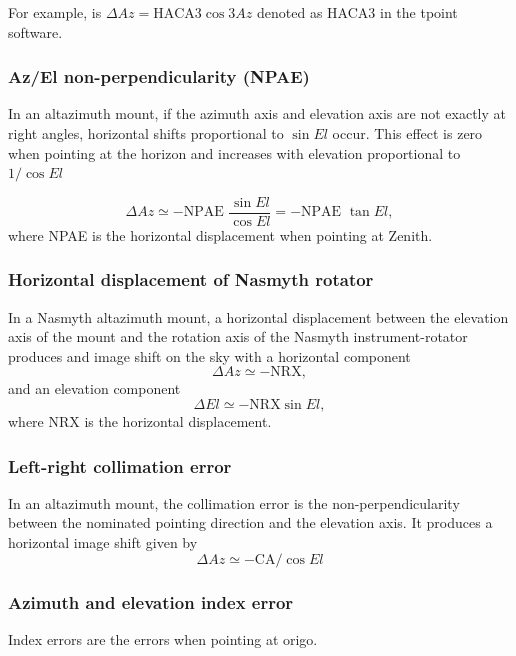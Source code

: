 For example, is $\Delta Az = \text{HACA3}\cos{3Az}$ denoted as HACA3 in the tpoint software.

\subsubsection{Az/El non-perpendicularity (NPAE)}
In an altazimuth mount, if the azimuth axis and elevation axis are not exactly at
right angles, horizontal shifts proportional to $\sin{El}$ occur. This effect is zero when pointing at the horizon and increases with elevation proportional to $1/\cos{El}$

\begin{equation}
    \Delta Az \simeq - \text{NPAE } \frac{\sin{El}}{\cos{El}}= - \text{NPAE } \tan{El},
\end{equation}
where NPAE is the horizontal displacement when pointing at Zenith.

\subsubsection{Horizontal displacement of Nasmyth rotator}
In a Nasmyth altazimuth mount, a horizontal displacement between the elevation axis of the mount and the rotation axis of the Nasmyth instrument-rotator produces
and image shift on the sky with a horizontal component
\begin{equation}
    \Delta Az \simeq - \text{NRX},
\end{equation}
and an elevation component
\begin{equation}
    \Delta El \simeq - \text{NRX} \sin{El},
\end{equation}
where NRX is the horizontal displacement.

\subsubsection{Left-right collimation error}
In an altazimuth mount, the collimation error is the non-perpendicularity between the nominated pointing direction and the elevation axis.
It produces a horizontal image shift given by
\begin{equation}\label{eq:pmodel_ca}
    \Delta Az \simeq -\text{CA} / \cos{El}
\end{equation}


\subsubsection{Azimuth and elevation index error}
Index errors are the errors when pointing at origo.

